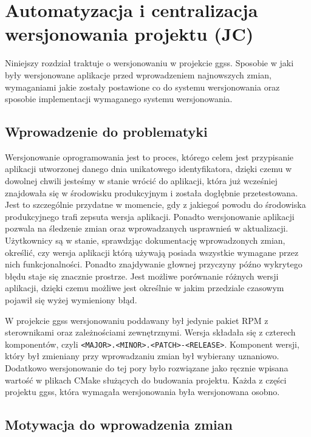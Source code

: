 \clearpage
\section{Automatyzacja i centralizacja wersjonowania projektu (JC)}
\label{ch:versioning}

Niniejszy rozdział traktuje o wersjonowaniu w projekcie ggss. Sposobie w jaki były wersjonowane aplikacje przed wprowadzeniem najnowszych zmian, wymaganiami jakie zostały postawione co do systemu wersjonowania oraz sposobie implementacji wymaganego systemu wersjonowania.

\subsection{Wprowadzenie do problematyki}

Wersjonowanie oprogramowania jest to proces, którego celem jest przypisanie aplikacji utworzonej danego dnia unikatowego identyfikatora, dzięki czemu w dowolnej chwili jesteśmy w stanie wrócić do aplikacji, która już wcześniej znajdowała się w środowisku produkcyjnym i została dogłębnie przetestowana. Jest to szczególnie przydatne w momencie, gdy z jakiegoś powodu do środowiska produkcyjnego trafi zepsuta wersja aplikacji. Ponadto wersjonowanie aplikacji pozwala na śledzenie zmian oraz wprowadzanych usprawnień w aktualizacji. Użytkownicy są w stanie, sprawdzjąc dokumentację wprowadzonych zmian, określić, czy wersja aplikacji którą używają posiada wszystkie wymagane przez nich funkcjonalności. Ponadto znajdywanie głownej przyczyny późno wykrytego błędu staje się znacznie prostrze. Jest możliwe porównanie różnych wersji aplikacji, dzięki czemu możliwe jest określnie w jakim przedziale czasowym pojawił się wyżej wymieniony błąd.

W projekcie ggss wersjonowaniu poddawany był jedynie pakiet RPM z sterownikami oraz zależnościami zewnętrznymi. Wersja składała się z czterech komponentów, czyli \lstinline{<MAJOR>.<MINOR>.<PATCH>-<RELEASE>}. Komponent wersji, który był zmieniany przy wprowadzaniu zmian był wybierany uznaniowo. Dodatkowo wersjonowanie do tej pory było rozwiązane jako ręcznie wpisana wartość w plikach CMake służących do budowania projektu. Każda z części projektu ggss, która wymagała wersjonowania była wersjonowana osobno.

\subsection{Motywacja do wprowadzenia zmian}

